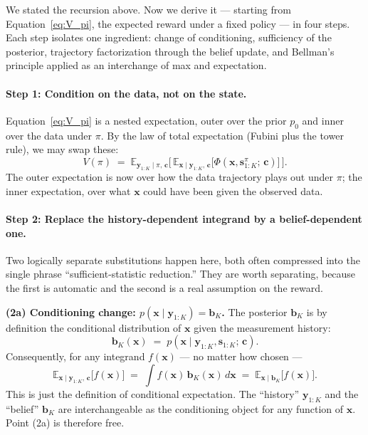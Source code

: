 \documentclass[11pt]{article}
\newcommand{\bc}{\bm{c}}
\newcommand{\bx}{\bm{x}}
\newcommand{\by}{\bm{y}}
\newcommand{\bs}{\bm{s}}
\newcommand{\bb}{\bm{b}}
\newcommand{\E}{\mathbb{E}}
\begin{document}
We stated the recursion above.  Now we derive it --- starting from Equation~\eqref{eq:V_pi}, the expected reward under a fixed policy --- in four steps.  Each step isolates one ingredient: change of conditioning, sufficiency of the posterior, trajectory factorization through the belief update, and Bellman's principle applied as an interchange of max and expectation.

\paragraph{Step 1: Condition on the data, not on the state.}  Equation~\eqref{eq:V_pi} is a nested expectation, outer over the prior $p_0$ and inner over the data under $\pi$.  By the law of total expectation (Fubini plus the tower rule), we may swap these:
\begin{equation}
V(\pi) \;=\; \E_{\by_{1:K} \mid \pi,\, \bc}\!\bigl[\, \E_{\bx \mid \by_{1:K},\, \bc}\!\bigl[\Phi(\bx, \bs_{1:K}^\pi;\, \bc)\bigr] \,\bigr].
\label{eq:V_pi_swap}
\end{equation}
The outer expectation is now over how the data trajectory plays out under $\pi$; the inner expectation, over what $\bx$ could have been given the observed data.

\paragraph{Step 2: Replace the history-dependent integrand by a belief-dependent one.}  Two logically separate substitutions happen here, both often compressed into the single phrase ``sufficient-statistic reduction.''  They are worth separating, because the first is automatic and the second is a real assumption on the reward.

\textbf{(2a) Conditioning change: $p(\bx \mid \by_{1:K}) = \bb_K$.}  The posterior $\bb_K$ is by definition the conditional distribution of $\bx$ given the measurement history:
\begin{equation}
\bb_K(\bx) \;=\; p(\bx \mid \by_{1:K}, \bs_{1:K};\, \bc).
\end{equation}
Consequently, for any integrand $f(\bx)$ --- no matter how chosen ---
\begin{equation}
\E_{\bx \mid \by_{1:K},\, \bc}\!\bigl[f(\bx)\bigr] \;=\; \int f(\bx)\, \bb_K(\bx)\, d\bx \;=\; \E_{\bx \mid \bb_K}\!\bigl[f(\bx)\bigr].
\label{eq:suff_of_bK}
\end{equation}
This is just the definition of conditional expectation.  The ``history'' $\by_{1:K}$ and the ``belief'' $\bb_K$ are interchangeable as the conditioning object for any function of $\bx$.  Point (2a) is therefore free.
\end{document}
